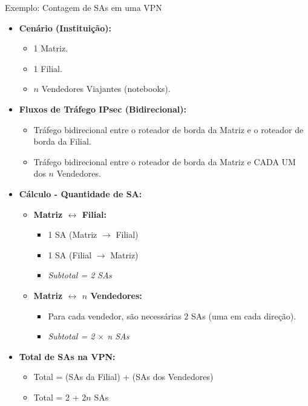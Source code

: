 \begin{frame}{Exemplo: Contagem de SAs em uma VPN}
    \begin{itemize}
        \item \textbf{Cenário (Instituição):}
              \begin{itemize}
                  \item 1 Matriz.
                  \item 1 Filial.
                  \item $n$ Vendedores Viajantes (notebooks).
              \end{itemize}

        \item \textbf{Fluxos de Tráfego IPsec (Bidirecional):}
              \begin{itemize}
                  \item Tráfego bidirecional entre o roteador de borda da Matriz e o roteador de borda da Filial.
                  \item Tráfego bidirecional entre o roteador de borda da Matriz e CADA UM dos $n$ Vendedores.
              \end{itemize}

        \item \textbf{Cálculo - Quantidade de SA:}
              \begin{itemize}
                  \item \textbf{Matriz $\leftrightarrow$ Filial:}
                        \begin{itemize}
                            \item 1 SA (Matriz $\rightarrow$ Filial)
                            \item 1 SA (Filial $\rightarrow$ Matriz)
                            \item \textit{Subtotal = 2 SAs}
                        \end{itemize}
                  \item \textbf{Matriz $\leftrightarrow$ $n$ Vendedores:}
                        \begin{itemize}
                            \item Para cada vendedor, são necessárias 2 SAs (uma em cada direção).
                            \item \textit{Subtotal = 2 $\times$ n SAs}
                        \end{itemize}
              \end{itemize}

        \item \textbf{Total de SAs na VPN:}
              \begin{itemize}
                  \item Total = (SAs da Filial) + (SAs dos Vendedores)
                  \item Total = 2 + 2$n$ SAs
              \end{itemize}
    \end{itemize}
\end{frame}

